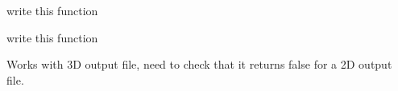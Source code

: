 
\begin{DoxyRefList}
\item[Member \mbox{\hyperlink{calculate_8h_aae8e3878546cdf1c65bce05c077e86ad}{calculate\+\_\+velocity}} (\mbox{\hyperlink{structSimul}{Simul}} \&simul)]\label{todo__todo000001}%
%
write this function 
\item[Member \mbox{\hyperlink{calculate_8h_a93ed9f231ff0b8da6fa1fec1fd493441}{calculate\+\_\+w\+\_\+dot}} (\mbox{\hyperlink{structFrame}{Frame}} current\+Frame, \mbox{\hyperlink{structFrame}{Frame}} previous\+Frame)]\label{todo__todo000002}%
%
write this function 
\item[" ]\label{todo__todo000003}%
%
Works with 3D output file, need to check that it returns false for a 2D output file. 
\end{DoxyRefList}